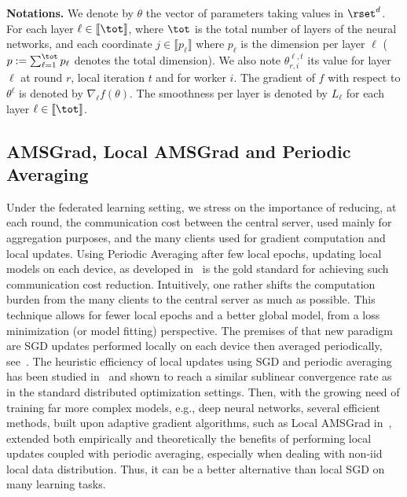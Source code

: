 \documentclass[manuscript,screen,review]{acmart}
\begin{document}
\noindent\textbf{Notations.} We denote by $\theta$ the vector of parameters taking values in $\rset^d$. 
For each layer $\ell \in \llbracket \tot \rrbracket$, where $\tot$ is the total number of layers of the neural networks, and each coordinate $j \in \llbracket p_\ell \rrbracket$ where $p_\ell$ is the dimension per layer $\ell$ ($p := \sum_{\ell=1}^\tot p_\ell$ denotes the total dimension).
We also note $\theta_{r,i}^{\ell,t}$ its value for layer $\ell$ at round $r$, local iteration $t$ and for worker $i$.
The gradient of $f$ with respect to $\theta^\ell$ is denoted by $\nabla_{\ell} f(\theta)$.
The smoothness per layer is denoted by $L_\ell$ for each layer $\ell \in \llbracket \tot \rrbracket$.


\subsection{AMSGrad, Local AMSGrad and Periodic Averaging}
Under the federated learning setting, we stress on the importance of reducing, at each round, the communication cost between the central server, used mainly for aggregation purposes, and the many clients used for gradient computation and local updates.
Using Periodic Averaging after few local epochs, updating local models on each device, as developed in~\citet{mcmahan2017communication} is the gold standard for achieving such communication cost reduction.
Intuitively, one rather shifts the computation burden from the many clients to the central server as much as possible. 
This technique allows for fewer local epochs and a better global model, from a loss minimization (or model fitting) perspective.
The premises of that new paradigm are SGD updates performed locally on each device then averaged periodically, see~\citet{konevcny2016federated, zhou2017convergence}.
The heuristic efficiency of local updates using SGD and periodic averaging has been studied in~\citet{stich2018local,yu2019linear} and shown to reach a similar sublinear convergence rate as in the standard distributed optimization settings.
Then, with the growing need of training far more complex models, e.g., deep neural networks, several efficient methods, built upon adaptive gradient algorithms, such as Local AMSGrad in~\citet{chen2020toward}, extended both empirically and theoretically the benefits of performing local updates coupled with periodic averaging, especially when dealing with non-iid local data distribution. Thus, it can be a better alternative than local SGD on many learning tasks.
\end{document}
